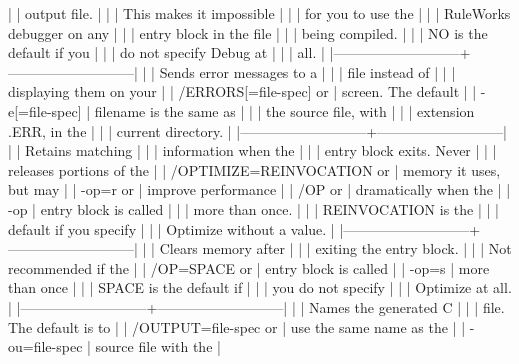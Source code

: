 |                           | output file.              |
|                           | This makes it impossible  |
|                           | for you to use the        |
|                           | RuleWorks debugger on any |
|                           | entry block in the file   |
|                           | being compiled.           |
|                           | NO is the default if you  |
|                           | do not specify Debug at   |
|                           | all.                      |
|---------------------------+---------------------------|
|                           | Sends error messages to a |
|                           | file instead of           |
|                           | displaying them on your   |
| /ERRORS[=file-spec] or    | screen. The default       |
| -e[=file-spec]            | filename is the same as   |
|                           | the source file, with     |
|                           | extension .ERR, in the    |
|                           | current directory.        |
|---------------------------+---------------------------|
|                           | Retains matching          |
|                           | information when the      |
|                           | entry block exits. Never  |
|                           | releases portions of the  |
| /OPTIMIZE=REINVOCATION or | memory it uses, but may   |
| -op=r or                  | improve performance       |
| /OP or                    | dramatically when the     |
| -op                       | entry block is called     |
|                           | more than once.           |
|                           | REINVOCATION is the       |
|                           | default if you specify    |
|                           | Optimize without a value. |
|---------------------------+---------------------------|
|                           | Clears memory after       |
|                           | exiting the entry block.  |
|                           | Not recommended if the    |
| /OP=SPACE or              | entry block is called     |
| -op=s                     | more than once            |
|                           | SPACE is the default if   |
|                           | you do not specify        |
|                           | Optimize at all.          |
|---------------------------+---------------------------|
|                           | Names the generated C     |
|                           | file. The default is to   |
| /OUTPUT=file-spec or      | use the same name as the  |
| -ou=file-spec             | source file with the      |
